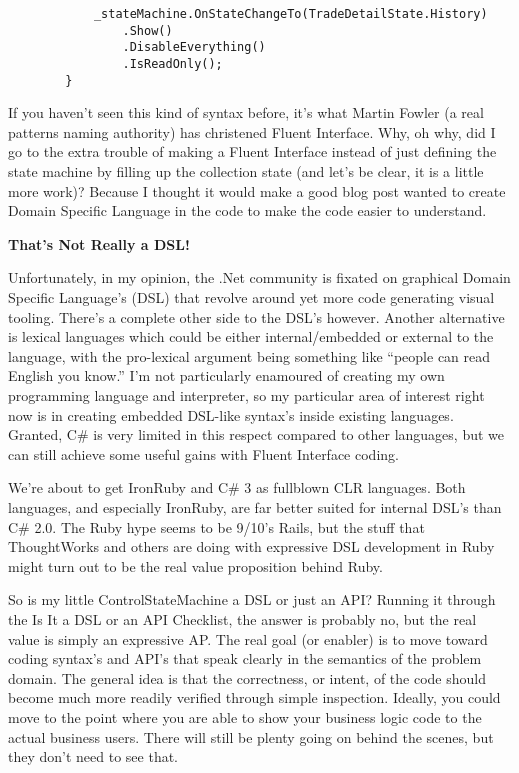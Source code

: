 \documentclass{article}
\begin{document}
{\begin{lstlisting}
            _stateMachine.OnStateChangeTo(TradeDetailState.History)
                .Show()
                .DisableEverything()
                .IsReadOnly();
        }
\end{lstlisting}
If you haven't seen this kind of syntax before, it's what Martin Fowler (a real patterns naming authority) has christened Fluent Interface.  Why, oh why, did I go to the extra trouble of making a Fluent Interface instead of just defining the state machine by filling up the collection state (and let's be clear, it is a little more work)?  Because I thought it would make a good blog post wanted to create Domain Specific Language in the code to make the code easier to understand.

 
\Large {\textbf{That's Not Really a DSL!}}

Unfortunately, in my opinion, the .Net community is fixated on graphical Domain Specific Language's (DSL) that revolve around yet more code generating visual tooling.  There's a complete other side to the DSL's however.  Another alternative is lexical languages which could be either internal/embedded or external to the language, with the pro-lexical argument being something like “people can read English you know.”  I'm not particularly enamoured of creating my own programming language and interpreter, so my particular area of interest right now is in creating embedded DSL-like syntax's inside existing languages.  Granted, C\# is very limited in this respect compared to other languages, but we can still achieve some useful gains with Fluent Interface coding. 

We're about to get IronRuby and C\# 3 as fullblown CLR languages.  Both languages, and especially IronRuby, are far better suited for internal DSL's than C\# 2.0.  The Ruby hype seems to be 9/10's Rails, but the stuff that ThoughtWorks and others are doing with expressive DSL development in Ruby might turn out to be the real value proposition behind Ruby.

So is my little ControlStateMachine a DSL or just an API?  Running it through the Is It a DSL or an API Checklist, the answer is probably no, but the real value is simply an expressive AP.  The real goal (or enabler) is to move toward coding syntax's and API's that speak clearly in the semantics of the problem domain.  The general idea is that the correctness, or intent, of the code should become much more readily verified through simple inspection.  Ideally, you could move to the point where you are able to show your business logic code to the actual business users.  There will still be plenty going on behind the scenes, but they don't need to see that.

}
\end{document}
